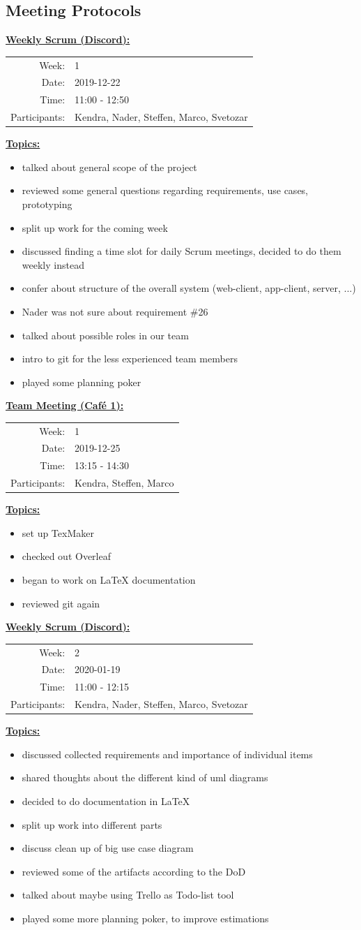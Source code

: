 \documentclass[a4paper, 12pt]{article}
\newcommand{\protocolheader}[5]{
    \vspace{1em}
    \underline{\textbf{#1:}}
    
    \begin{tabular}{rl}
        Week:   & #2\\
        Date:   & #3\\
        Time:   & #4\\
        Participants:   & #5\\
    \end{tabular}
    
    \vspace{1em}
    \underline{\textbf{Topics:}}
}
\begin{document}
\subsection{Meeting Protocols}

\protocolheader{Weekly Scrum (Discord)}{1}{2019-12-22}{11:00 - 12:50}
    {Kendra, Nader, Steffen, Marco, Svetozar}
\begin{itemize}
    \item talked about general scope of the project
    \item reviewed some general questions regarding requirements, use cases, prototyping
    \item split up work for the coming week
    \item discussed finding a time slot for daily Scrum meetings, decided to do them weekly instead
    \item confer about structure of the overall system (web-client, app-client, server, ...)
    \item Nader was not sure about requirement \#26
    \item talked about possible roles in our team
    \item intro to git for the less experienced team members
    \item played some planning poker
\end{itemize}

\newpage
\protocolheader{Team Meeting (Café 1)}{1}{2019-12-25}{13:15 - 14:30}
    {Kendra, Steffen, Marco}
\begin{itemize}
    \item set up TexMaker
    \item checked out Overleaf
    \item began to work on LaTeX documentation
    \item reviewed git again
\end{itemize}

\protocolheader{Weekly Scrum (Discord)}{2}{2020-01-19}{11:00 - 12:15}
    {Kendra, Nader, Steffen, Marco, Svetozar}
\begin{itemize}
    \item discussed collected requirements and importance of individual items
    \item shared thoughts about the different kind of uml diagrams
    \item decided to do documentation in LaTeX
    \item split up work into different parts
    \item discuss clean up of big use case diagram
    \item reviewed some of the artifacts according to the DoD
    \item talked about maybe using Trello as Todo-list tool
    \item played some more planning poker, to improve estimations
\end{itemize}
\end{document}
